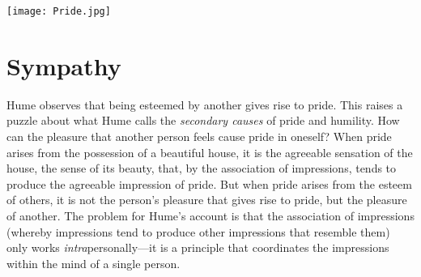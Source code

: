 \texttt{[image: Pride.jpg]}

% 



\section{Sympathy}\label{sec:sympathy} %

Hume observes that being esteemed by another gives rise to pride. This raises a puzzle about what Hume calls the \emph{secondary causes} of pride and humility. How can the pleasure that another person feels cause pride in oneself? When pride arises from the possession of a beautiful house, it is the agreeable sensation of the house, the sense of its beauty, that, by the association of impressions, tends to produce the agreeable impression of pride. But when pride arises from the esteem of others, it is not the person's pleasure that gives rise to pride, but the pleasure of another. The problem for Hume's account is that the association of impressions (whereby impressions tend to produce other impressions that resemble them) only works \emph{intra}personally---it is a principle that coordinates the impressions within the mind of a single person. \change

